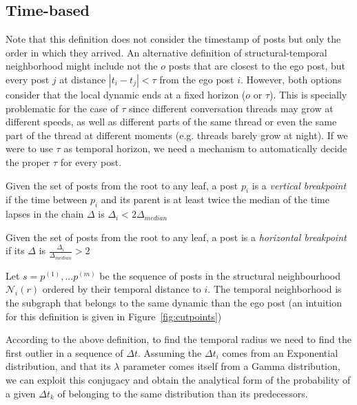 \documentclass[smallextended]{svjour3}          %
\begin{document}
\subsection{Time-based}
Note that this definition does not consider the timestamp of posts but only the order in which they arrived. An alternative definition of structural-temporal neighborhood might include not the $o$  posts that are closest to the ego post, but every post $j$ at distance $|t_i-t_j|<\tau$ from the ego post $i$. However, both options consider that the local dynamic ends at a fixed horizon ($o$ or $\tau$). This is specially problematic for the case of $\tau$ since different conversation threads may grow at different speeds, as well as different parts of the same thread or even the same part of the thread at different moments (e.g. threads barely grow at night). If we were to use $\tau$ as temporal horizon, we need a mechanism to automatically decide the proper $\tau$ for every post. 

\begin{definition}
Given the set of posts from the root to any leaf, a post $p_i$ is a \textit{vertical breakpoint} if the time between $p_i$ and its parent is at least twice the median of the time lapses in the chain  $\Delta$ is   $\Delta_i < 2 \Delta_{median}$
\end{definition}

\begin{definition}
Given the set of posts from the root to any leaf, a post is a \textit{horizontal breakpoint} if its $\Delta$ is   $\frac{\Delta_i}{\Delta_{median}}>2$
\end{definition}

\begin{definition}
Let $s={p^{(1)},...p^{(m)}}$ be the sequence of posts in the structural neighbourhood $\mathcal{N}_i(r)$ ordered by their temporal distance to $i$. The temporal neighborhood is the subgraph that belongs to the same dynamic than the ego post 
(an intuition for this definition is given in Figure~\ref{fig:cutpoints})
\end{definition}
 
According to the above definition, to find the temporal radius we need to find the first outlier in a sequence of $\Delta t$. Assuming the $\Delta t_i$ comes from an Exponential distribution, and that its $\lambda$ parameter comes itself from a Gamma distribution, we can exploit this conjugacy and obtain the analytical form of the probability of a given $\Delta t_k$ of belonging to the same distribution than its predecessors.
\end{document}
